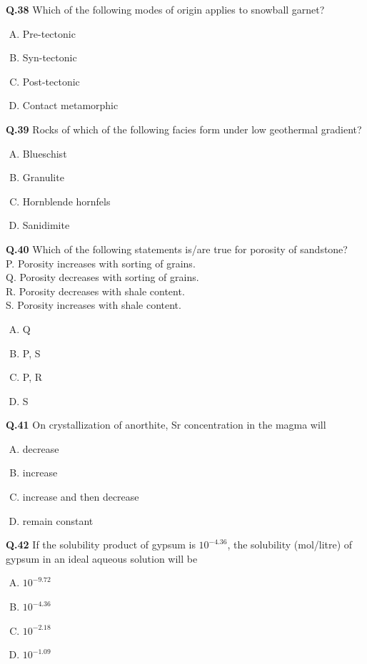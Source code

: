 \textbf{Q.38} Which of the following modes of origin applies to snowball garnet?
\begin{enumerate}[(A)]
    \item Pre-tectonic
    \item Syn-tectonic
    \item Post-tectonic
    \item Contact metamorphic
\end{enumerate}

\textbf{Q.39} Rocks of which of the following facies form under low geothermal gradient?
\begin{enumerate}[(A)]
    \item Blueschist
    \item Granulite
    \item Hornblende hornfels
    \item Sanidimite
\end{enumerate}

\textbf{Q.40} Which of the following statements is/are true for porosity of sandstone? \\
P. Porosity increases with sorting of grains. \\
Q. Porosity decreases with sorting of grains. \\
R. Porosity decreases with shale content. \\
S. Porosity increases with shale content.
\begin{enumerate}[(A)]
    \item Q
    \item P, S
    \item P, R
    \item S
\end{enumerate}

\textbf{Q.41} On crystallization of anorthite, Sr concentration in the magma will
\begin{enumerate}[(A)]
    \item decrease
    \item increase
    \item increase and then decrease
    \item remain constant
\end{enumerate}

\textbf{Q.42} If the solubility product of gypsum is $10^{-4.36}$, the solubility (mol/litre) of gypsum in an ideal aqueous solution will be
\begin{multicols}{4}
    

\begin{enumerate}[(A)]
    \item $10^{-9.72}$
    \item $10^{-4.36}$
    \item $10^{-2.18}$
    \item $10^{-1.09}$
\end{enumerate}
\end{multicols}

